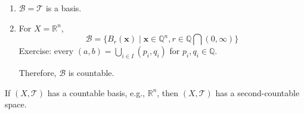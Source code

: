 \begin{example}
\begin{enumerate}
\item
$\mathcal{B}=\mathcal{T}$ is a basis.
\item
For $X=\mathbb{R}^n$,
\[
\mathcal{B}=\{B_r(\bm x)\mid \bm x\in\mathbb{Q}^n,r\in\mathbb{Q}\bigcap(0,\infty)\}
\]
Exercise: every $(a,b)=\bigcup_{i\in I}(p_i,q_i)$ for $p_i,q_i\in\mathbb{Q}$.

Therefore, $\mathcal{B}$ is countable.
\end{enumerate}
\end{example}
\begin{proposition}
If $(X,\mathcal{T})$ has a countable basis, e.g., $\mathbb{R}^n$, then $(X,\mathcal{T})$ has a second-countable space.
\end{proposition}




















